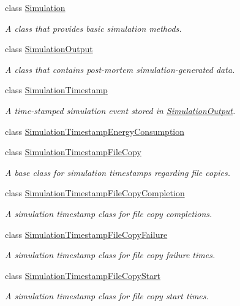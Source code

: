 \begin{DoxyCompactItemize}
class \hyperlink{classwrench_1_1_simulation}{Simulation}
\begin{DoxyCompactList}\small\item\em A class that provides basic simulation methods. \end{DoxyCompactList}\item 
class \hyperlink{classwrench_1_1_simulation_output}{Simulation\+Output}
\begin{DoxyCompactList}\small\item\em A class that contains post-\/mortem simulation-\/generated data. \end{DoxyCompactList}\item 
class \hyperlink{classwrench_1_1_simulation_timestamp}{Simulation\+Timestamp}
\begin{DoxyCompactList}\small\item\em A time-\/stamped simulation event stored in \hyperlink{classwrench_1_1_simulation_output}{Simulation\+Output}. \end{DoxyCompactList}\item 
class \hyperlink{classwrench_1_1_simulation_timestamp_energy_consumption}{Simulation\+Timestamp\+Energy\+Consumption}
\item 
class \hyperlink{classwrench_1_1_simulation_timestamp_file_copy}{Simulation\+Timestamp\+File\+Copy}
\begin{DoxyCompactList}\small\item\em A base class for simulation timestamps regarding file copies. \end{DoxyCompactList}\item 
class \hyperlink{classwrench_1_1_simulation_timestamp_file_copy_completion}{Simulation\+Timestamp\+File\+Copy\+Completion}
\begin{DoxyCompactList}\small\item\em A simulation timestamp class for file copy completions. \end{DoxyCompactList}\item 
class \hyperlink{classwrench_1_1_simulation_timestamp_file_copy_failure}{Simulation\+Timestamp\+File\+Copy\+Failure}
\begin{DoxyCompactList}\small\item\em A simulation timestamp class for file copy failure times. \end{DoxyCompactList}\item 
class \hyperlink{classwrench_1_1_simulation_timestamp_file_copy_start}{Simulation\+Timestamp\+File\+Copy\+Start}
\begin{DoxyCompactList}\small\item\em A simulation timestamp class for file copy start times. \end{DoxyCompactList}\item 

\end{DoxyCompactItemize}
